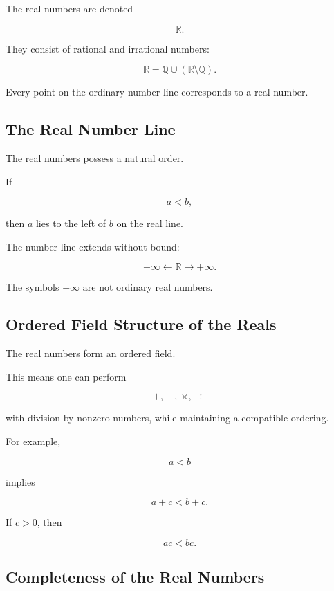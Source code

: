 The real numbers are denoted

\[
\boxed{
\mathbb{R}.
}
\]

They consist of rational and irrational numbers:

\[
\boxed{
\mathbb{R}
=
\mathbb{Q}
\cup
(\mathbb{R}\setminus\mathbb{Q}).
}
\]

Every point on the ordinary number line corresponds to a real number.

\subsection{The Real Number Line}
\label{subsec:real-number-line-reference}

The real numbers possess a natural order.

If

\[
a<b,
\]

then \(a\) lies to the left of \(b\) on the real line.

The number line extends without bound:

\[
\boxed{
-\infty
\longleftarrow
\mathbb{R}
\longrightarrow
+\infty.
}
\]

The symbols \(\pm\infty\) are not ordinary real numbers.

\subsection{Ordered Field Structure of the Reals}
\label{subsec:real-ordered-field}

The real numbers form an ordered field.

This means one can perform

\[
\boxed{
+,\ -,\ \times,\ \div
}
\]

with division by nonzero numbers, while maintaining a compatible ordering.

For example,

\[
a<b
\]

implies

\[
\boxed{
a+c<b+c.
}
\]

If \(c>0\), then

\[
\boxed{
ac<bc.
}
\]

\subsection{Completeness of the Real Numbers}
\label{subsec:real-completeness-reference}

